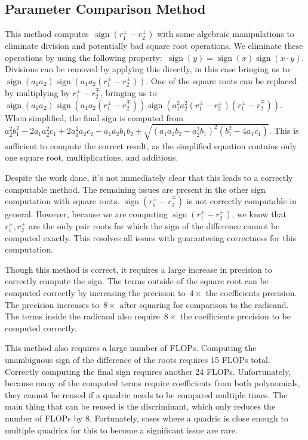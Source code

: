 \documentclass{cccg16}
\DeclareMathOperator{\sign}{sign}
\begin{document}
\subsection{Parameter Comparison Method}
This method computes~$\sign(r_1^\pm-r_2^\pm)$ with some algebraic
manipulations to eliminate division and potentially bad square root
operations.  We eliminate these operations by using the following
property:~$\sign(y)=\sign(x)\sign(x\cdot y)$.  Divisions can be
removed by applying this directly, in this case bringing us
to~$\sign(a_1 a_2)\sign(a_1 a_2 (r_1^\pm-r_2^\pm))$.  One of the
square roots can be replaced by multiplying by $r_1^\pm-r_2^\mp$,
bringing us to~$\sign(a_1 a_2)\sign(a_1 a_2
(r_1^\pm-r_2^\mp))\sign(a_1^2 a_2^2 (r_1^\pm - r_2^\pm) (r_1^\pm -
r_2^\mp))$.  When simplified, the final sign is computed
from~$a_2^2b_1^2-2a_1a_2^2c_1+2a_1^2a_2c_2-a_1a_2b_1b_2\pm
\sqrt{(a_1a_2b_2-a_2^2b_1)^2(b_1^2-4a_1c_1)}$. This is sufficient to
compute the correct result, as the simplified equation contains only
one square root, multiplications, and additions.

Despite the work done, it's not immediately clear that this leads to a
correctly computable method.  The remaining issues are present in the
other sign computation with square roots. $\sign(r_1^\pm-r_2^\mp)$ is
not correctly computable in general.  However, because we are
computing $\sign(r_1^\pm-r_2^\pm)$, we know that $r_1^\pm, r_2^\pm$
are the only pair roots for which the sign of the difference cannot be
computed exactly.  This resolves all issues with guaranteeing
correctness for this computation.

Though this method is correct, it requires a large increase in
precision to correctly compute the sign. The terms outside of the
square root can be computed correctly by increasing the precision
to~$4\times$ the coefficients precision.  The precision increases
to~$8\times$ after squaring for comparison to the radicand.  The terms
inside the radicand also require~$8\times$ the coefficients precision
to be computed correctly.

This method also requires a large number of FLOPs.  Computing the
unambiguous sign of the difference of the roots requires 15 FLOPs
total.  Correctly computing the final sign requires another 24 FLOPs.
Unfortunately, because many of the computed terms require coefficients
from both polynomials, they cannot be reused if a quadric needs to be
compared multiple times.  The main thing that can be reused is the
discriminant, which only reduces the number of FLOPs by 8.
Fortunately, cases where a quadric is close enough to multiple
quadrics for this to become a significant issue are rare.
\end{document}
